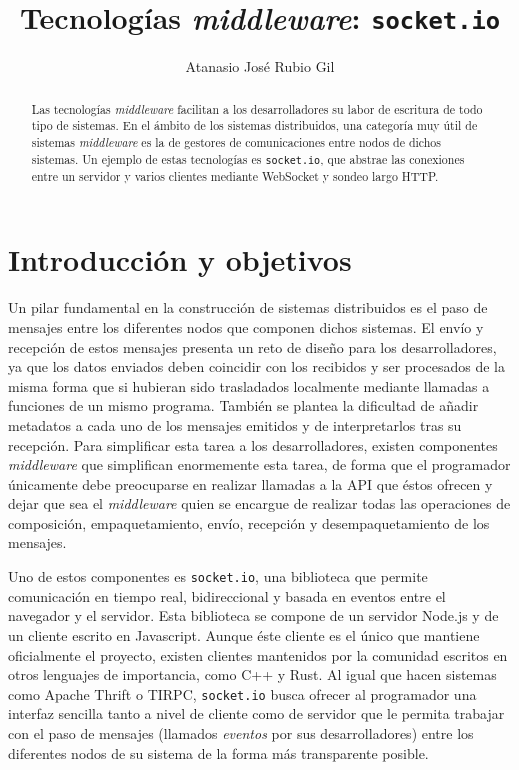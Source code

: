\documentclass[runningheads]{llncs}
\title{Tecnologías \textit{middleware}: \texttt{socket.io}}
\author{Atanasio José Rubio Gil}
\institute{Universidad de Granada, 18010 Granada, España}
\begin{document}
\maketitle

\begin{abstract}
Las tecnologías \textit{middleware} facilitan a los desarrolladores su labor de escritura de todo tipo de sistemas.
En el ámbito de los sistemas distribuidos, una categoría muy útil de sistemas \textit{middleware} es la de gestores de comunicaciones entre nodos de dichos sistemas.
Un ejemplo de estas tecnologías es \texttt{socket.io}, que abstrae las conexiones entre un servidor y varios clientes mediante WebSocket y sondeo largo HTTP\@.

\end{abstract}

\section{Introducción y objetivos}

Un pilar fundamental en la construcción de sistemas distribuidos es el paso de mensajes entre los diferentes nodos que componen dichos sistemas.
El envío y recepción de estos mensajes presenta un reto de diseño para los desarrolladores, ya que los datos enviados deben coincidir con los recibidos y ser procesados de la misma forma que si hubieran sido trasladados localmente mediante llamadas a funciones de un mismo programa.
También se plantea la dificultad de añadir metadatos a cada uno de los mensajes emitidos y de interpretarlos tras su recepción.
Para simplificar esta tarea a los desarrolladores, existen componentes \textit{middleware} que simplifican enormemente esta tarea, de forma que el programador únicamente debe preocuparse en realizar llamadas a la API que éstos ofrecen y dejar que sea el \textit{middleware} quien se encargue de realizar todas las operaciones de composición, empaquetamiento, envío, recepción y desempaquetamiento de los mensajes.

Uno de estos componentes es \texttt{socket.io}, una biblioteca que permite comunicación en tiempo real, bidireccional y basada en eventos entre el navegador y el servidor\cite{what-socketio-is}.
Esta biblioteca se compone de un servidor Node.js y de un cliente escrito en Javascript.
Aunque éste cliente es el único que mantiene oficialmente el proyecto, existen clientes mantenidos por la comunidad escritos en otros lenguajes de importancia, como C++\cite{socket.io-client-cpp} y Rust\cite{rust-socketio}.
Al igual que hacen sistemas como Apache Thrift o TIRPC, \texttt{socket.io} busca ofrecer al programador una interfaz sencilla tanto a nivel de cliente como de servidor que le permita trabajar con el paso de mensajes (llamados \textit{eventos} por sus desarrolladores) entre los diferentes nodos de su sistema de la forma más transparente posible.
\end{document}

